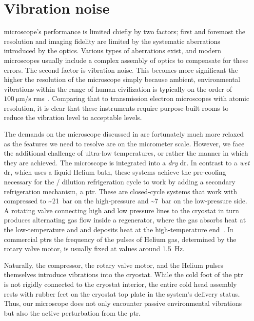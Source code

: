 \chapter{Vibration noise}\label{ch:setup:vibrations}
 microscope's performance is limited chiefly by two factors; first and foremost the resolution and imaging fidelity are limited by the systematic aberrations introduced by the optics.
Various types of aberrations exist, and modern microscopes usually include a complex assembly of optics to compensate for these errors.
The second factor is vibration noise.
This becomes more significant the higher the resolution of the microscope simply because ambient, environmental vibrations within the range of human civilization is typically on the order of $\qty{100}{\micro\meter\per\second}$ \gls{rms}~\cite{Gordon1999}.
Comparing that to transmission electron microscopes with atomic resolution, it is clear that these instruments require purpose-built rooms to reduce the vibration level to acceptable levels.

The demands on the microscope discussed in \thethesis are fortunately much more relaxed as the features we need to resolve are on the micrometer scale.
However, we face the additional challenge of ultra-low temperatures, or rather the manner in which they are achieved.
The microscope is integrated into a \emph{dry} \gls{dr}.
In contrast to a \emph{wet} \gls{dr}, which uses a liquid Helium bath, these systems achieve the pre-cooling necessary for the / dilution refrigeration cycle to work by adding a secondary refrigeration mechanism, a \gls{ptr}.
These are closed-cycle systems that work with  compressed to \textasciitilde\qty{21}{\bar} on the high-pressure and \textasciitilde\qty{7}{\bar} on the low-pressure side.
A rotating valve connecting high and low pressure lines to the cryostat in turn produces alternating gas flow inside a regenerator, where the gas absorbs heat at the low-temperature and and deposits heat at the high-temperature end~\cite{Radebaugh2009,DeWaele2011}.
In commercial \glspl{ptr} the frequency of the pulses of Helium gas, determined by the rotary valve motor, is usually fixed at values around \qty{1.5}{\hertz}.

Naturally, the compressor, the rotary valve motor, and the Helium pulses themselves introduce vibrations into the cryostat.
While the cold foot of the \gls{ptr} is not rigidly connected to the cryostat interior,
the entire cold head assembly rests with rubber feet on the cryostat top plate in the system's delivery status.
Thus, our microscope does not only encounter passive environmental vibrations but also the active perturbation from the \gls{ptr}.

